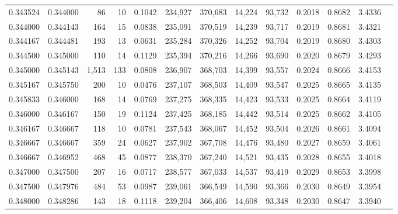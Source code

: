 \begin{tabular}{rrrrrrrrrrrrr}
0.343524 & 0.344000 &    86 &  10 &                                     0.1042 & 234,927 & 370,683 &  14,224 &  93,732 & 0.2018 & 0.8682 & 3.4336 \\
0.344000 & 0.344143 &   164 &  15 &                                     0.0838 & 235,091 & 370,519 &  14,239 &  93,717 & 0.2019 & 0.8681 & 3.4321 \\
0.344167 & 0.344481 &   193 &  13 &                                     0.0631 & 235,284 & 370,326 &  14,252 &  93,704 & 0.2019 & 0.8680 & 3.4303 \\
0.344500 & 0.345000 &   110 &  14 &                                     0.1129 & 235,394 & 370,216 &  14,266 &  93,690 & 0.2020 & 0.8679 & 3.4293 \\
0.345000 & 0.345143 & 1,513 & 133 &                                     0.0808 & 236,907 & 368,703 &  14,399 &  93,557 & 0.2024 & 0.8666 & 3.4153 \\
0.345167 & 0.345750 &   200 &  10 &                                     0.0476 & 237,107 & 368,503 &  14,409 &  93,547 & 0.2025 & 0.8665 & 3.4135 \\
0.345833 & 0.346000 &   168 &  14 &                                     0.0769 & 237,275 & 368,335 &  14,423 &  93,533 & 0.2025 & 0.8664 & 3.4119 \\
0.346000 & 0.346167 &   150 &  19 &                                     0.1124 & 237,425 & 368,185 &  14,442 &  93,514 & 0.2025 & 0.8662 & 3.4105 \\
0.346167 & 0.346667 &   118 &  10 &                                     0.0781 & 237,543 & 368,067 &  14,452 &  93,504 & 0.2026 & 0.8661 & 3.4094 \\
0.346667 & 0.346667 &   359 &  24 &                                     0.0627 & 237,902 & 367,708 &  14,476 &  93,480 & 0.2027 & 0.8659 & 3.4061 \\
0.346667 & 0.346952 &   468 &  45 &                                     0.0877 & 238,370 & 367,240 &  14,521 &  93,435 & 0.2028 & 0.8655 & 3.4018 \\
0.347000 & 0.347500 &   207 &  16 &                                     0.0717 & 238,577 & 367,033 &  14,537 &  93,419 & 0.2029 & 0.8653 & 3.3998 \\
0.347500 & 0.347976 &   484 &  53 &                                     0.0987 & 239,061 & 366,549 &  14,590 &  93,366 & 0.2030 & 0.8649 & 3.3954 \\
0.348000 & 0.348286 &   143 &  18 &                                     0.1118 & 239,204 & 366,406 &  14,608 &  93,348 & 0.2030 & 0.8647 & 3.3940 \\

\end{tabular}
